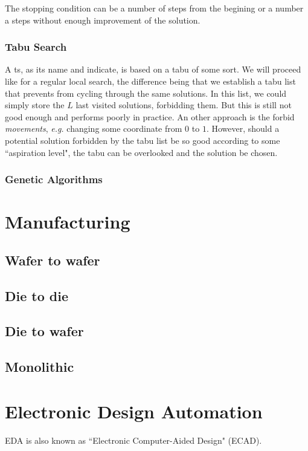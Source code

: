\documentclass[12pt,a4paper]{article}
\theoremstyle{customdef}
\begin{document}
The stopping condition can be a number of steps from the begining or a number a steps without enough improvement of the solution.

\subsubsection{Tabu Search}
A \acrlong{ts}, as its name and \cite{Pirlot1996} indicate, is based on a tabu of some sort.
We will proceed like for a regular local search, the difference being that we establish a tabu list that prevents from cycling through the same solutions.
In this list, we could simply store the $L$ last visited solutions, forbidding them.
But this is still not good enough and performs poorly in practice.
An other approach is the forbid \textit{movements}, \textit{e.g.} changing some coordinate from $0$ to $1$.
However, should a potential solution forbidden by the tabu list be so good according to some ``aspiration level", the tabu can be overlooked and the solution be chosen.

\subsubsection{Genetic Algorithms}




\section{Manufacturing}

\subsection{Wafer to wafer}

\subsection{Die to die}

\subsection{Die to wafer}

\subsection{Monolithic}

\section{Electronic Design Automation}
EDA is also known as ``Electronic Computer-Aided Design" (ECAD).
\end{document}
